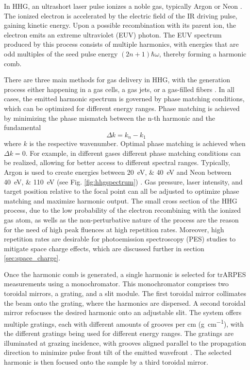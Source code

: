 In HHG, an ultrashort laser pulse ionizes a noble gas, typically Argon or Neon \cite{rudawski_high-flux_2013}.
The ionized electron is accelerated by the electric field of the IR driving pulse, gaining kinetic energy.
Upon a possible recombination with its parent ion, the electron emits an extreme ultraviolet (EUV) photon.
The EUV spectrum produced by this process consists of multiple harmonics, with energies that are odd multiples of the seed pulse energy $(2n+1) \hbar\omega$, thereby forming a harmonic comb.

There are three main methods for gas delivery in HHG, with the generation process either happening in a gas cells, a gas jets, or a gas-filled fibers \cite{paul_quasi-phase-matched_2003, heckl_high_2009, sudmeyer_femtosecond_2008, roser_131w220fs_2005}.
In all cases, the emitted harmonic spectrum is governed by phase matching conditions, which can be optimized for different energy ranges.
Phase matching is achieved by minimizing the phase mismatch between the n-th harmonic and the fundamental
\begin{equation}
	\Delta k = k_n - k_1
\end{equation}
where $k$ is the respective wavenumber. 
Optimal phase matching is achieved when $\Delta k=0$.
For example, in different gases different phase matching conditions can be realized, allowing for better access to different spectral ranges.
Typically, Argon is used to create energies between \qtylist{20; 40}{\electronvolt} and Neon between \qtylist{40; 110}{\electronvolt} (see Fig. \ref{fig:hhgspectrum}) \cite{rudawski_high-flux_2013}.
Gas pressure, laser intensity, and target position relative to the focal point can all be adjusted to optimize phase matching and maximize harmonic output.
The small cross section of the HHG process, due to the low probability of the electron recombining with the ionized gas atom, as wells as the non-perturbative nature of the process are the reason for the need of high peak fluences at high repetition rates.
Moreover, high repetition rates are desirable for photoemission spectroscopy (PES) studies to mitigate space charge effects, which are discussed further in section \ref{sec:space_charge}.

Once the harmonic comb is generated, a single harmonic is selected for trARPES measurements using a monochromator.
This monochromator comprises two toroidal mirrors, a grating, and a slit module.
The first toroidal mirror collimates the beam onto the grating, where the harmonics are dispersed.
A second toroidal mirror refocuses the desired harmonic onto an adjustable slit.
The system offers multiple gratings, each with different amounts of grooves per \unit{cm} (\unit{g\per\cm}), with the different gratings being used for different energy ranges.
The gratings are illuminated at grazing incidence, with grooves aligned parallel to the propagation direction to minimize pulse front tilt of the emitted wavefront \cite{poletto_time-preserving_2010}.
The selected harmonic is then focused onto the sample by a third toroidal mirror.

